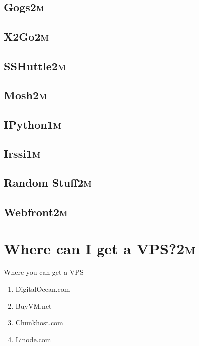 \documentclass[presentation,aspectratio=169]{beamer}
\begin{document}
\subsection[Gogs]{Gogs\hfill{}\textsc{2m}}
\label{sec-4-4}
\subsection[X2Go]{X2Go\hfill{}\textsc{2m}}
\label{sec-4-5}
\subsection[SSHuttle]{SSHuttle\hfill{}\textsc{2m}}
\label{sec-4-6}
\subsection[Mosh]{Mosh\hfill{}\textsc{2m}}
\label{sec-4-7}
\subsection[IPython]{IPython\hfill{}\textsc{1m}}
\label{sec-4-8}
\subsection[Irssi]{Irssi\hfill{}\textsc{1m}}
\label{sec-4-9}
\subsection[Random Stuff]{Random Stuff\hfill{}\textsc{2m}}
\label{sec-4-10}
\subsection[Webfront]{Webfront\hfill{}\textsc{2m}}
\label{sec-4-11}
\section[Where can I get a VPS?]{Where can I get a VPS?\hfill{}\textsc{2m}}
\label{sec-5}
\begin{frame}[label=sec-5-0-1]{Where you can get a VPS}
\begin{enumerate}
\item DigitalOcean.com
\item BuyVM.net
\item Chunkhost.com
\item Linode.com
\end{enumerate}
\end{frame}
\end{document}
